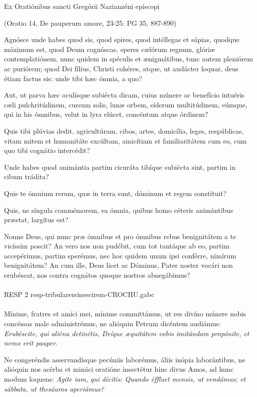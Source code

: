 \documentclass[options]{article}
\begin{document}
	Ex Oratiónibus sancti Gregórii Nazianzéni epíscopi
	\begin{flushright}
	(Oratio 14, De pauperum amore, 23-25: PG 35, 887-890)		
	\end{flushright} 
	Agnósce unde habes quod sis, quod spires, quod intéllegas et sápias, quodque máximum est, quod Deum cognóscas, speres cælórum regnum, glóriæ contemplatiónem, nunc quidem in spéculis et ænigmátibus, tunc autem pleniórem ac puriórem; quod Dei fílius, Christi cohéres, atque, ut audácter loquar, deus étiam factus sis: unde tibi hæc ómnia, a quo?
	
	\noindent Aut, ut parva hæc oculísque subiécta dicam, cuius múnere ac benefício intuéris cæli pulchritúdinem, cursum solis, lunæ orbem, síderum multitúdinem, eúmque, qui in his ómnibus, velut in lyra elúcet, concéntum atque órdinem?
	
	\noindent Quis tibi plúvias dedit, agricultúram, cibos, artes, domicília, leges, respúblicas, vitam mitem et humanitáte excúltam, amicítiam et familiaritátem cum eo, cum quo tibi cognátio intercédit?
	
	\noindent Unde habes quod animántia partim cicuráta tibíque subiécta sint, partim in cibum trádita?
	
	\noindent Quis te ómnium rerum, quæ in terra sunt, dóminum et regem constítuit?
	
	\noindent Quis, ne síngula commémorem, ea ómnia, quibus homo céteris animántibus præstat, largítus est?
	
	\noindent Nonne Deus, qui nunc præ ómnibus et pro ómnibus rebus benignitátem a te vicíssim poscit? An vero nos non pudébit, cum tot tantáque ab eo, partim accepérimus, partim sperémus, nec hoc quidem unum ipsi conférre, nimírum benignitátem? An cum ille, Deus licet ac Dóminus, Pater noster vocári non erubéscat, nos contra cognátos quoque nostros abnegábimus?\\
	\\
	RESP 2 resp-tribularersinescirem-CROCHU.gabc\\
	\\
	\noindent Mínime, fratres et amíci mei, mínime committámus, ut res divíno múnere nobis concéssas male administrémus, ne alióquin Petrum dicéntem audiámus: \emph{Erubéscite, qui aliéna detinétis, Deíque æquitátem vobis imitándam propónite, et nemo erit pauper.}
	
	\noindent Ne congeréndis asservandísque pecúniis laborémus, áliis inópia laborántibus, ne alióquin nos acérba et mináci oratióne insectétur hinc divus Amos, ad hunc modum loquens: \emph{Agite iam, qui dícitis: Quando éffluet mensis, ut vendámus; et sábbata, ut thesáuros aperiámus?}
	
\end{document}
